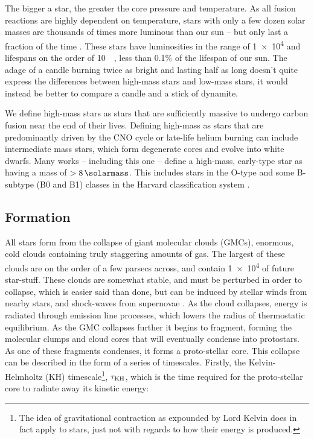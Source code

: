 The bigger a star, the greater the core pressure and temperature.
As all fusion reactions are highly dependent on temperature, stars with only a few dozen solar masses are thousands of times more luminous than our sun -- but only last a fraction of the time \parencite{carrollIntroductionModernAstrophysics2014}.
These stars have luminosities in the range of \SI{1e4}{\solarluminosity} and lifespans on the order of \SI{10}{\mega\year}, less than 0.1\% of the lifespan of our sun.
The adage of a candle burning twice as bright and lasting half as long doesn't quite express the differences between high-mass stars and low-mass stars, it would instead be better to compare a candle and a stick of dynamite.

We define high-mass stars as stars that are sufficiently massive to undergo carbon fusion near the end of their lives.
Defining high-mass as stars that are predominantly driven by the CNO cycle or late-life helium burning can include intermediate mass stars, which form degenerate cores and evolve into white dwarfs.
Many works -- including this one -- define a high-mass, early-type star as having a mass of $>\SI{8}{\solarmass}$.
This includes stars in the O-type and some B-subtype (B0 and B1) classes in the Harvard classification system
\parencite[143]{ward-thompsonIntroductionStarFormation2011}.


\subsection{Formation}
\label{sec:starformation}

All stars form from the collapse of giant molecular clouds (GMCs), enormous, cold clouds containing truly staggering amounts of gas.
The largest of these clouds are on the order of a few parsecs across, and contain \SI{1e4}{\solarmass} of future star-stuff.
These clouds are somewhat stable, and must be perturbed in order to collapse, which is easier said than done, but can be induced by stellar winds from nearby stars, and shock-waves from supernovae
\parencite[Ch.~3]{bodenheimerPrinciplesStarFormation2011}.
As the cloud collapses, energy is radiated through emission line processes, which lowers the radius of thermostatic equilibrium.
As the GMC collapses further it begins to fragment, forming the molecular clumps and cloud cores that will eventually condense into protostars.
As one of these fragments condenses, it forms a proto-stellar core.
This collapse can be described in the form of a series of timescales.
Firstly, the Kelvin-Helmholtz (KH) timescale\footnote{The idea of gravitational contraction as expounded by Lord Kelvin does in fact apply to stars, just not with regards to how their energy is produced.}, $\tau_\text{KH}$, which is the time required for the proto-stellar core to radiate away its kinetic energy:

